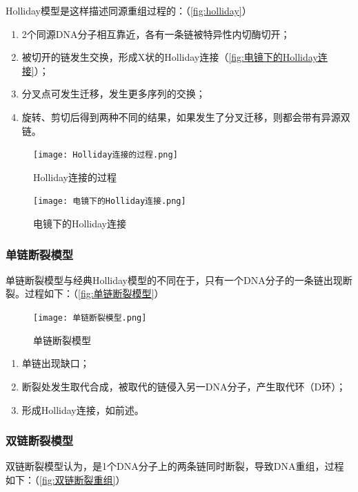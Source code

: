 Holliday模型是这样描述同源重组过程的：（\autoref{fig:holliday}）

\begin{enumerate}
	\item 2个同源DNA分子相互靠近，各有一条链被特异性内切酶切开；
	\item 被切开的链发生交换，形成X状的Holliday连接（\autoref{fig:电镜下的Holliday连接}）；
	\item 分叉点可发生迁移，发生更多序列的交换；
	\item 旋转、剪切后得到两种不同的结果，如果发生了分叉迁移，则都会带有异源双链。
\end{enumerate}

\begin{figure}[htbp]
	\centering
	\texttt{[image: Holliday连接的过程.png]}
	\caption{Holliday连接的过程}
	\label{fig:holliday}
\end{figure}


\begin{figure}[htbp]
	\centering
	\texttt{[image: 电镜下的Holliday连接.png]}
	\caption{电镜下的Holliday连接}
	\label{fig:电镜下的Holliday连接}
\end{figure}

\subsubsection{单链断裂模型}

单链断裂模型与经典Holliday模型的不同在于，只有一个DNA分子的一条链出现断裂。过程如下：（\autoref{fig:单链断裂模型}）

\begin{figure}[htbp]
	\centering
	\texttt{[image: 单链断裂模型.png]}
	\caption{单链断裂模型}
	\label{fig:单链断裂模型}
\end{figure}

\begin{enumerate}
	\item 单链出现缺口；
	\item 断裂处发生取代合成，被取代的链侵入另一DNA分子，产生取代环（D环）；
	\item 形成Holliday连接，如前述。
\end{enumerate}

\subsubsection{双链断裂模型}

双链断裂模型认为，是1个DNA分子上的两条链同时断裂，导致DNA重组，过程如下：（\autoref{fig:双链断裂重组}）

